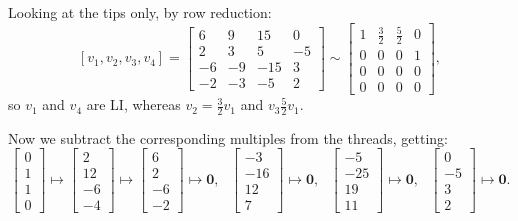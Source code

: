 \documentclass[12pt]{article}
\newcommand{\1}{\mathbf{1}}
\newcommand{\0}{\mathbf{0}}
\theoremstyle{definition}
\begin{document}
Looking at the tips only, by row reduction:
\[
[v_1, v_2, v_3, v_4] =
\left[\begin{matrix}6 & 9 & 15 & 0\\2 & 3 & 5 & -5\\-6 & -9 & -15 & 3\\-2 & -3 & -5 & 2\end{matrix}\right]
\sim
\left[\begin{matrix}1 & \frac{3}{2} & \frac{5}{2} & 0\\0 & 0 & 0 & 1\\0 & 0 & 0 & 0\\0 & 0 & 0 & 0\end{matrix}\right]
,
\]
so $v_1$ and $v_4$ are LI, whereas $v_2 = \frac{3}{2} v_1$ and $v_3 \frac{5}{2} v_1$.

Now we subtract the corresponding multiples from the threads, getting:
\[
\left[\begin{matrix}0\\1\\1\\0\end{matrix}\right]
\mapsto
\left[\begin{matrix}2\\12\\-6\\-4\end{matrix}\right]
\mapsto
\left[\begin{matrix}6\\2\\-6\\-2\end{matrix}\right]
\mapsto
\0
, \ \ \
\left[\begin{matrix}-3\\-16\\12\\7\end{matrix}\right]
\mapsto
\0
, \ \ \
\left[\begin{matrix}-5\\-25\\19\\11\end{matrix}\right]
\mapsto
\0
, \ \ \
\left[\begin{matrix}0\\-5\\3\\2\end{matrix}\right]
\mapsto
\0
.
\]
\end{document}
